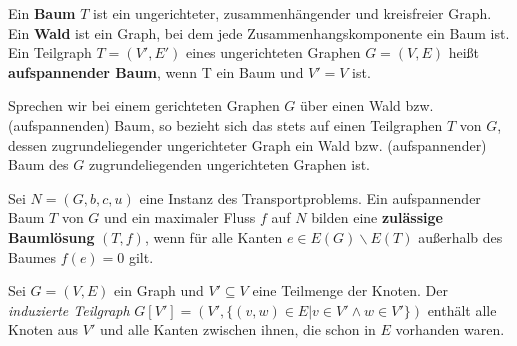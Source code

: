\begin{defn}Ein \textbf{Baum} $T$ ist ein ungerichteter, zusammenhängender und kreisfreier Graph. Ein \textbf{Wald} ist ein Graph, bei dem jede Zusammenhangskomponente ein Baum ist.\\
Ein Teilgraph $T=(V',E')$ eines ungerichteten Graphen $G=(V,E)$ heißt \textbf{aufspannender Baum}, wenn T ein Baum und $V'=V$ ist.\end{defn}

\begin{anm}Sprechen wir bei einem gerichteten Graphen $G$ über einen Wald bzw. (aufspannenden) Baum, so bezieht sich das stets auf einen Teilgraphen $T$ von $G$, dessen zugrundeliegender ungerichteter Graph ein Wald bzw. (aufspannender) Baum des $G$ zugrundeliegenden ungerichteten Graphen ist.\end{anm}

\begin{defn}Sei $N=(G,b,c,u)$ eine Instanz des Transportproblems. Ein aufspannender Baum $T$ von $G$ und ein maximaler Fluss $f$ auf $N$ bilden eine \textbf{zulässige Baumlösung} $(T,f)$, wenn für alle Kanten $e\in E(G)\backslash E(T)$ außerhalb des Baumes $f(e) = 0$ gilt.\end{defn}

\begin{nota}Sei $G=(V,E)$ ein Graph und $V'\subseteq V$ eine Teilmenge der Knoten. Der \emph{induzierte Teilgraph} $G[V']=(V',\{(v,w)\in E|v\in V'\land w\in V'\})$ enthält alle Knoten aus $V'$ und alle Kanten zwischen ihnen, die schon in $E$ vorhanden waren.\end{nota}

